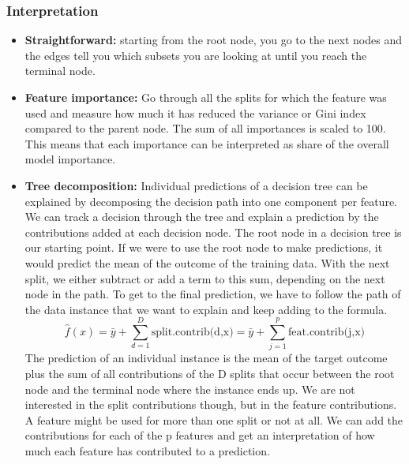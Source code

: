 \subsubsection{Interpretation}
\begin{itemize}
    \item \textbf{Straightforward:} starting from the root node, you go to the next nodes and the edges tell you
    which subsets you are looking at until you reach the terminal node.
    \item \textbf{Feature importance:} Go through all the splits for which the feature was used and measure how much it has reduced the
    variance or Gini index compared to the parent node. The sum of all importances is scaled to 100. This means that each importance can be interpreted as share of the overall model importance.
    \item \textbf{Tree decomposition:} Individual predictions of a decision tree can be explained by decomposing the decision path into one component per feature. We can track a decision through the tree and explain a prediction by the contributions added at each decision node.
    The root node in a decision tree is our starting point. If we were to use the root node to make predictions, it would predict the mean of the outcome of the training data. With the next split, we either subtract or add a term to this sum, depending on the next node in the path. To get to the final prediction, we have to follow the path of the data instance that we want to explain and keep adding to the formula.
    \begin{equation*}
        \hat{f}(x)=\bar{y}+\sum_{d=1}^D\text{split.contrib(d,x)}=\bar{y}+\sum_{j=1}^p\text{feat.contrib(j,x)}
    \end{equation*}
    The prediction of an individual instance is the mean of the target outcome plus the sum of all contributions of the D splits that occur between the root node and the terminal node where the instance ends up. We are not interested in the split contributions though, but in the feature contributions. A feature might be used for more than one split or not at all. We can add the contributions for each of the p features and get an interpretation of how much each feature has contributed to a prediction.
\end{itemize}
\newpage
